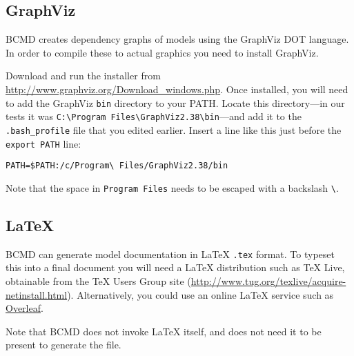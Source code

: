 \documentclass[a4paper,11pt]{article}
\begin{document}
\subsection{GraphViz}

BCMD creates dependency graphs of models using the GraphViz DOT language. In order to compile these to actual graphics you need to install GraphViz.

Download and run the installer from \url{http://www.graphviz.org/Download_windows.php}. Once installed, you will need to add the GraphViz \texttt{bin} directory to your PATH. Locate this directory---in our tests it was \texttt{C:\textbackslash{}Program Files\textbackslash{}GraphViz2.38\textbackslash{}bin}---and add it to the \texttt{.bash\_profile} file that you edited earlier. Insert a line like this just before the \texttt{export PATH} line:
\begin{verbatim}
PATH=$PATH:/c/Program\ Files/GraphViz2.38/bin
\end{verbatim}
Note that the space in \texttt{Program Files} needs to be escaped with a backslash \texttt{\textbackslash{}}.

\subsection{LaTeX}

BCMD can generate model documentation in \LaTeX{} \texttt{.tex} format. To typeset this into a final document you will need a \LaTeX{} distribution such as TeX Live, obtainable from the TeX Users Group site (\url{http://www.tug.org/texlive/acquire-netinstall.html}). Alternatively, you could use an online \LaTeX{} service such as \href{https://www.overleaf.com}{Overleaf}.

Note that BCMD does not invoke \LaTeX{} itself, and does not need it to be present to generate the file.



\end{document}
